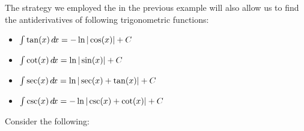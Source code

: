 \documentclass{ximera}
\begin{document}
The strategy we employed the in the previous example will also allow us to find the antiderivatives of following trigonometric functions:


\begin{theorem}\hfil
  \begin{itemize}
  \item $\int \tan(x) \mathop{}\!d\! x = -\ln|\cos(x)| + C$
  \item $\int \cot(x) \mathop{}\!d\! x = \ln|\sin(x)| + C$
  \item $\int \sec(x) \mathop{}\!d\! x = \ln|\sec(x) + \tan(x)| + C$
  \item $\int \csc(x) \mathop{}\!d\! x = -\ln|\csc(x) + \cot(x)| + C$
  \end{itemize}
\end{theorem}

Consider the following:
\end{document}
